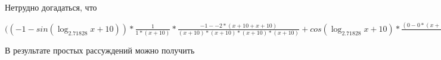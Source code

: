 \documentclass[12pt,a4paper,fleqn]{article}
\theoremstyle{definition}
\begin{document}
Нетрудно догадаться, что

$(( -1  - sin(\log_{ 2.71828 }{ x  +  10 })) * \frac{ 1 }{ 1  * ( x  +  10 )}
 * \frac{ -1  -  -2  * ( x  +  10  +  x  +  10 )}{( x  +  10 ) * ( x  +  10 ) * ( x  +  10 ) * ( x  +  10 )}
 + cos(\log_{ 2.71828 }{ x  +  10 }) * \frac{( 0  -  0  * ( x  +  10  +  x  +  10 ) +  -4 ) * ( x  +  10 ) * ( x  +  10 ) * ( x  +  10 ) * ( x  +  10 ) - ( -1  -  -2  * ( x  +  10  +  x  +  10 )) * (( 1  * ( x  +  10 ) + ( x  +  10 ) *  1 ) * ( x  +  10 ) * ( x  +  10 ) + ( x  +  10 ) * ( x  +  10 ) * ( 1  * ( x  +  10 ) + ( x  +  10 ) *  1 ))}{( x  +  10 ) * ( x  +  10 ) * ( x  +  10 ) * ( x  +  10 ) * ( x  +  10 ) * ( x  +  10 ) * ( x  +  10 ) * ( x  +  10 )}
 = ( -1  - sin(\log_{ 2.71828 }{ x  +  10 })) * \frac{ 1 }{ 1  * ( x  +  10 )}
 * \frac{ -1  -  -2  * ( x  +  10  +  x  +  10 )}{( x  +  10 ) * ( x  +  10 ) * ( x  +  10 ) * ( x  +  10 )}
 + cos(\log_{ 2.71828 }{ x  +  10 }) * \frac{( 0  -  0  * ( x  +  10  +  x  +  10 ) +  -4 ) * ( x  +  10 ) * ( x  +  10 ) * ( x  +  10 ) * ( x  +  10 ) - ( -1  -  -2  * ( x  +  10  +  x  +  10 )) * (( 1  * ( x  +  10 ) + ( x  +  10 ) *  1 ) * ( x  +  10 ) * ( x  +  10 ) + ( x  +  10 ) * ( x  +  10 ) * ( 1  * ( x  +  10 ) + ( x  +  10 ) *  1 ))}{( x  +  10 ) * ( x  +  10 ) * ( x  +  10 ) * ( x  +  10 ) * ( x  +  10 ) * ( x  +  10 ) * ( x  +  10 ) * ( x  +  10 )}
$

В результате простых рассуждений можно получить
\end{document}
